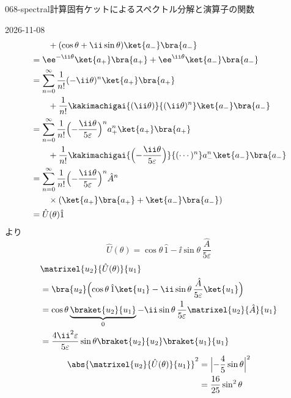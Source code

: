 \documentclass[uplatex,dvipdfmx,a4paper,11pt]{jsarticle}
\begin{document}
\begin{mondai}{068-spectral}{計算}{固有ケットによるスペクトル分解と演算子の関数}
\begin{kotaeutsushi}{2026-11-08}
\begin{align*}
&\qquad+(\cos\theta+\ii\sin\theta)\ket{a_{-}}\bra{a_{-}}\\
&=\ee^{-\ii\theta}\ket{a_{+}}\bra{a_{+}}+\ee^{\ii\theta}\ket{a_{-}}\bra{a_{-}}\\
&=\sum_{n=0}^{\infty}\frac{1}{n!}(-\ii\theta)^{n}\ket{a_{+}}\bra{a_{+}}\\
&\qquad+\frac{1}{n!}\kakimachigai{(\ii\theta)}{(\ii\theta)^{n}}\ket{a_{-}}\bra{a_{-}}\\
&=\sum_{n=0}^{\infty}\frac{1}{n!}\Bigl(-\frac{\ii\theta}{5\varepsilon}\Bigr)^{n}a_{+}^{n}\ket{a_{+}}\bra{a_{+}}\\
&\qquad+\frac{1}{n!}\kakimachigai{\Bigl(-\frac{\ii\theta}{5\varepsilon}\Bigr)}{(\cdots)^{n}}a_{-}^{n}\ket{a_{-}}\bra{a_{-}}\\
&=\sum_{n=0}^{\infty}\frac{1}{n!}\Bigl(-\frac{\ii\theta}{5\varepsilon}\Bigr)^{n}\hat{A}^{n}\\
&\qquad\times(\ket{a_{+}}\bra{a_{+}}+\ket{a_{-}}\bra{a_{-}})\\
&=\hat{U}(\theta)\hat{1}
\end{align*}
より
\[ \hat{U}(\theta)=\cos\theta\,\hat{1}-\ii\sin\theta\,\frac{\hat{A}}{5\varepsilon} \]
\begin{align*}
&\matrixel{u_{2}}{\hat{U}(\theta)}{u_{1}}\\
&=\bra{u_{2}}\Bigl(\cos\theta\,\hat{1}\ket{u_{1}}-\ii\sin\theta\,\frac{\hat{A}}{5\varepsilon}\ket{u_{1}}\Bigr)\\
&=\cos\theta\underbrace{\braket{u_{2}}{u_{1}}}_{0}-\ii\sin\theta\,\frac{1}{5\varepsilon}\matrixel{u_{2}}{\hat{A}}{u_{1}}\\
&=\frac{4\ii^{2}\varepsilon}{5\varepsilon}\sin\theta\braket{u_{2}}{u_{2}}\braket{u_{1}}{u_{1}}
\end{align*}
\begin{align*}
\abs{\matrixel{u_{2}}{\hat{U}(\theta)}{u_{1}}}^{2}&=\Bigl\lvert-\frac{4}{5}\sin\theta\Bigr\rvert^{2}\\
&=\frac{16}{25}\sin^{2}\theta
\end{align*}
\end{kotaeutsushi}
\end{mondai}
\end{document}

